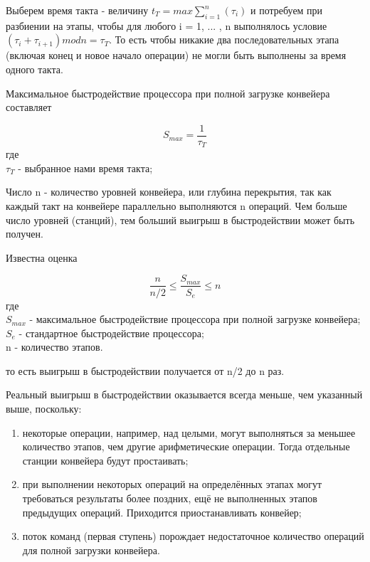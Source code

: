 Выберем время такта - величину $t_{T} = max{\sum\limits_{i=1}^n(\tau_{i})}$ и потребуем при разбиении на этапы, чтобы для любого i = 1, ... , n выполнялось условие $(\tau_{i} + \tau_{i+1}) mod n = \tau_{T}$. То есть чтобы никакие два последовательных этапа (включая конец и новое начало операции) не могли быть выполнены за время одного такта.

Максимальное быстродействие процессора при полной загрузке конвейера составляет

\begin{equation}\label{eq:1.3}
 S_{max}={\frac{1}{\tau_{T}}}
\end{equation}
где \\
$\tau_{T}$ - выбранное нами время такта;

Число n - количество уровней конвейера, или глубина перекрытия, так как каждый такт на конвейере параллельно выполняются n операций. Чем больше число уровней (станций), тем больший выигрыш в быстродействии может быть получен.

Известна оценка

\begin{equation}\label{eq:1.4}
\frac{n}{n/2} \leq \frac{S_{max}}{S_{e}} \leq n
\end{equation}
где \\
$S_{max}$ - максимальное быстродействие процессора  при полной загрузке конвейера; \\
$S_{e}$ - стандартное быстродействие процессора; \\
n - количество этапов.

то есть выигрыш в быстродействии получается от n/2  до n раз.


Реальный выигрыш в быстродействии оказывается всегда меньше, чем указанный выше, поскольку:

\begin{enumerate}
\item некоторые операции, например, над целыми, могут выполняться за меньшее количество этапов, чем другие арифметические операции. Тогда отдельные станции конвейера будут простаивать;
\item при выполнении некоторых операций на определённых этапах могут требоваться результаты более поздних, ещё не выполненных этапов предыдущих операций. Приходится приостанавливать конвейер;
\item поток команд (первая ступень) порождает недостаточное количество операций для полной загрузки конвейера.
\end{enumerate}

